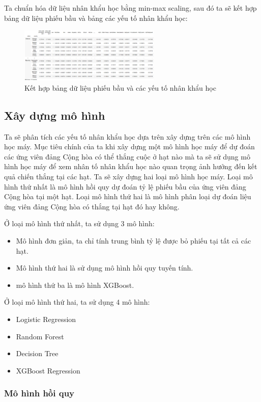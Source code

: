 \documentclass[14pt, a4paper]{article}
\numberwithin{equation}{section}
\numberwithin{figure}{section}
\numberwithin{dl}{section}
\numberwithin{md}{section}
\numberwithin{bd}{section}
\numberwithin{dn}{section}
\numberwithin{hq}{section}
\begin{document}
    Ta chuẩn hóa dữ liệu nhân khẩu học bằng min-max scaling, sau đó ta sẽ kết hợp bảng dữ liệu phiếu bầu và bảng các yếu tố nhân khẩu học:

    \begin{figure}[h!]
        \centering
        \includegraphics[width=0.6\textwidth]{figures/President_Normalized_Demographic_Merged_Dataframe.png}
        \caption{Kết hợp bảng dữ liệu phiếu bầu và các yếu tố nhân khẩu học}
    \end{figure}

    \subsection{Xây dựng mô hình}

    Ta sẽ phân tích các yếu tố nhân khẩu học dựa trên xây dựng trên các mô hình học máy.
    Mục tiêu chính của ta khi xây dựng một mô hình học máy để dự đoán các ứng viên đảng Cộng hòa có thể thắng cuộc ở hạt nào mà ta sẽ sử dụng mô hình học máy để xem nhân tố nhân khẩu học nào quan trọng ảnh hưởng đến kết quả chiến thắng tại các hạt.
    Ta sẽ xây dựng hai loại mô hình học máy. 
    Loại mô hình thứ nhất là mô hình hồi quy dự đoán tỷ lệ phiếu bầu của ứng viên đảng Cộng hòa tại một hạt.
    Loại mô hình thứ hai là mô hình phân loại dự đoán liệu ứng viên đảng Cộng hòa có thắng tại hạt đó hay không.

    Ở loại mô hình thứ nhất, ta sử dụng 3 mô hình:

    \begin{itemize}
        \item Mô hình đơn giản, ta chỉ tính trung bình tỷ lệ được bỏ phiếu tại tất cả các hạt.
        \item Mô hình thứ hai là sử dụng mô hình hồi quy tuyến tính.
        \item mô hình thứ ba là mô hình XGBoost.
    \end{itemize}

    Ở loại mô hình thứ hai, ta sử dụng 4 mô hình:

    \begin{itemize}
        \item Logistic Regression
        \item Random Forest
        \item Decision Tree
        \item XGBoost Regression
    \end{itemize}

    \subsubsection{Mô hình hồi quy}




    \newpage
    \printbibliography[title={TÀI LIỆU THAM KHẢO}]
\end{document}
